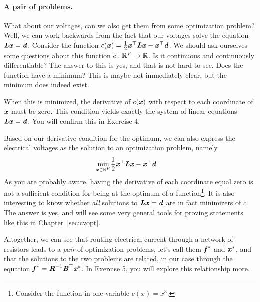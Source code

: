 \paragraph{A pair of problems.}
What about our voltages, can we also get them from some optimization
problem?
%
Well, we can work backwards from the fact that our voltages solve the
equation $\boldsymbol{\mathit{L}} \boldsymbol{\mathit{x}} = \boldsymbol{\mathit{d}}$.
%
Consider the function $c(\boldsymbol{\mathit{x}}) = \frac{1}{2} \boldsymbol{\mathit{x}}^{\top} \boldsymbol{\mathit{L}} \boldsymbol{\mathit{x}} -
\boldsymbol{\mathit{x}}^{\top}\boldsymbol{\mathit{d}}$.
We should ask ourselves some questions about this function $c : \mathbb{R}^V
\to \mathbb{R}$. Is it continuous and continuously differentiable? The answer to this is
yes, and that is not hard to see.
Does the function have a minimum?
This is maybe not immediately clear, but the minimum does indeed exist.

When this is minimized, the derivative of $c(\boldsymbol{\mathit{x}})$ with respect to each coordinate of $\boldsymbol{\mathit{x}}$
must be zero. This condition yields exactly the system of linear
equations $\boldsymbol{\mathit{L}} \boldsymbol{\mathit{x}} = \boldsymbol{\mathit{d}}$.
You will confirm this in Exercise 4.

Based on our derivative condition for the optimum, we can also express the electrical voltages as the solution to
an optimization problem, namely
\begin{align*}
\min_{\boldsymbol{\mathit{x}} \in \mathbb{R}^V} & \frac{1}{2} \boldsymbol{\mathit{x}}^{\top} \boldsymbol{\mathit{L}} \boldsymbol{\mathit{x}} -
\boldsymbol{\mathit{x}}^{\top}\boldsymbol{\mathit{d}}
\end{align*}
As you are probably aware, having the derivative of each coordinate equal zero is not a
sufficient condition for being at the optimum of a
function\footnote{Consider the function in one variable $c(x) =
  x^3$.}.
It is also interesting to know whether \emph{all} solutions to $\boldsymbol{\mathit{L}}
\boldsymbol{\mathit{x}} = \boldsymbol{\mathit{d}}$ are in fact minimizers of $c$. The answer is
yes, and will see some very general tools for proving statements like
this in Chapter~\ref{sec:cvopt}.

Altogether, we can see that routing electrical current through a
network of resistors leads to a \emph{pair} of optimization problems,
let's call them $\boldsymbol{\mathit{f}}^*$ and $\boldsymbol{\mathit{x}}^*$,
and that the solutions to the two problems are related, in our case
through the equation $\boldsymbol{\mathit{f}}^* = \boldsymbol{\mathit{R}}^{-1}\boldsymbol{\mathit{B}}^{\top} \boldsymbol{\mathit{x}}^*$.
In Exercise 5, you will explore this relationship more.
\\

